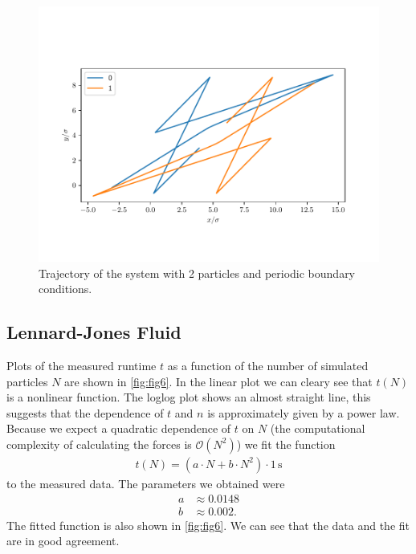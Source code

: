\documentclass[a4paper,10pt,bibtotoc]{scrartcl}
\begin{document}
\begin{figure}[t]
 \includegraphics{trajectory_pbc.pdf}
 \caption{Trajectory of the system with 2 particles and periodic boundary conditions.}
 \label{fig:fig5}
\end{figure}

\subsection{Lennard-Jones Fluid}
Plots of the measured runtime $t$ as a function of the number of simulated particles $N$ are shown in \autoref{fig:fig6}.
In the linear plot we can cleary see that $t(N)$ is a nonlinear function. 
The loglog plot shows an almost straight line, this suggests that the dependence of $t$ and $n$ is approximately given by a power law.
Because we expect a quadratic dependence of $t$ on $N$ (the computational complexity of calculating the forces is $\mathcal{O}(N^2)$) we fit the function
\begin{align}
 t(N) = \left(a\cdot N + b\cdot N^2\right)\cdot 1\,\mathrm{s}
\end{align}
to the measured data. 
The parameters we obtained were
\begin{align}
 a &\approx 0.0148\\
 b &\approx 0.002.
\end{align}
The fitted function is also shown in \autoref{fig:fig6}. 
We can see that the data and the fit are in good agreement. 
\end{document}
